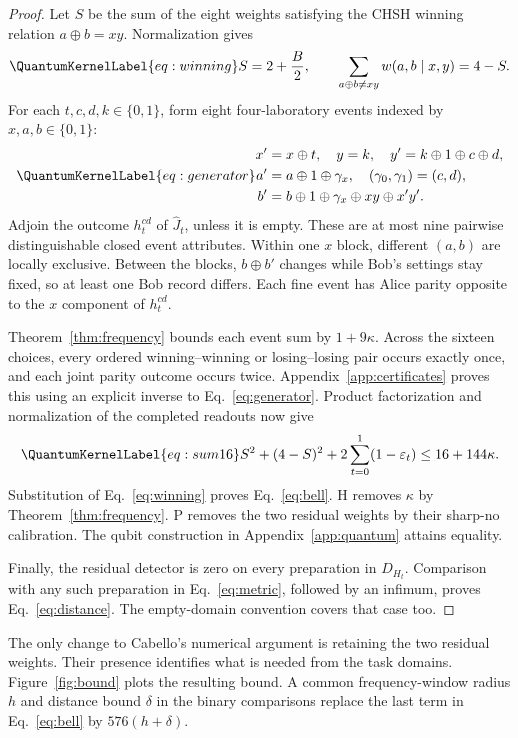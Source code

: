 \documentclass[a4paper,11pt,twocolumn,unpublished]{quantumarticle}
\let\label\QuantumKernelLabel
\newcommand{\eps}{\varepsilon}
\begin{document}
\begin{proof}
Let $S$ be the sum of the eight weights satisfying the CHSH winning relation $a\oplus b=xy$. Normalization gives
\begin{equation}\label{eq:winning}
 S=2+\frac B2,\qquad
 \sum_{a\oplus b\ne xy}w(a,b\mid x,y)=4-S.
\end{equation}
For each $t,c,d,k\in\{0,1\}$, form eight four-laboratory events indexed by $x,a,b\in\{0,1\}$:
\begin{equation}\label{eq:generator}
\begin{aligned}
 x'&=x\oplus t,\quad y=k,\quad y'=k\oplus1\oplus c\oplus d,\\
 a'&=a\oplus1\oplus\gamma_x,\quad(\gamma_0,\gamma_1)=(c,d),\\
 b'&=b\oplus1\oplus\gamma_x\oplus xy\oplus x'y'.
\end{aligned}
\end{equation}
Adjoin the outcome $h^{cd}_t$ of $\widehat J_t$, unless it is empty. These are at most nine pairwise distinguishable closed event attributes. Within one $x$ block, different $(a,b)$ are locally exclusive. Between the blocks, $b\oplus b'$ changes while Bob's settings stay fixed, so at least one Bob record differs. Each fine event has Alice parity opposite to the $x$ component of $h^{cd}_t$.

Theorem~\ref{thm:frequency} bounds each event sum by $1+9\kappa$. Across the sixteen choices, every ordered winning--winning or losing--losing pair occurs exactly once, and each joint parity outcome occurs twice. Appendix~\ref{app:certificates} proves this using an explicit inverse to Eq.~\eqref{eq:generator}. Product factorization and normalization of the completed readouts now give
\begin{equation}\label{eq:sum16}
 S^2+(4-S)^2+2\sum_{t=0}^1(1-\eps_t)\leq16+144\kappa.
\end{equation}
Substitution of Eq.~\eqref{eq:winning} proves Eq.~\eqref{eq:bell}. H removes $\kappa$ by Theorem~\ref{thm:frequency}. P removes the two residual weights by their sharp-no calibration. The qubit construction in Appendix~\ref{app:quantum} attains equality.

Finally, the residual detector is zero on every preparation in $D_{H_t}$. Comparison with any such preparation in Eq.~\eqref{eq:metric}, followed by an infimum, proves Eq.~\eqref{eq:distance}. The empty-domain convention covers that case too.
\end{proof}

The only change to Cabello's numerical argument is retaining the two residual weights. Their presence identifies what is needed from the task domains. Figure~\ref{fig:bound} plots the resulting bound. A common frequency-window radius $h$ and distance bound $\delta$ in the binary comparisons replace the last term in Eq.~\eqref{eq:bell} by $576(h+\delta)$.
\end{document}
